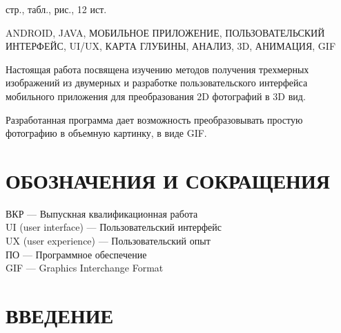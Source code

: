 \documentclass[a4paper,12pt]{article}
\begin{document}
 стр.,  табл.,  рис., 12 ист. 

ANDROID, JAVA, МОБИЛЬНОЕ ПРИЛОЖЕНИЕ, ПОЛЬЗОВАТЕЛЬСКИЙ ИНТЕРФЕЙС, UI/UX, КАРТА ГЛУБИНЫ, АНАЛИЗ, 3D, АНИМАЦИЯ, GIF

Настоящая работа посвящена изучению методов получения трехмерных изображений из двумерных и разработке пользовательского интерфейса мобильного приложения для преобразования 2D фотографий в 3D вид. 

Разработанная программа дает возможность преобразовывать простую фотографию в объемную картинку, в виде GIF.

\pagebreak
\thispagestyle{empty}

\section*{\centering ОБОЗНАЧЕНИЯ И СОКРАЩЕНИЯ}

ВКР --- Выпускная квалификационная работа\\

UI (user interface) --- Пользовательский интерфейс\\

UX (user experience) --- Пользовательский опыт\\

ПО --- Программное обеспечение\\

GIF --- Graphics Interchange Format\\


\pagebreak

\tableofcontents

\pagebreak

\section*{\centering ВВЕДЕНИЕ}
\pagebreak

%
\pagebreak
\pagebreak
\pagebreak
\pagebreak
\pagebreak
\pagebreak
\end{document}
